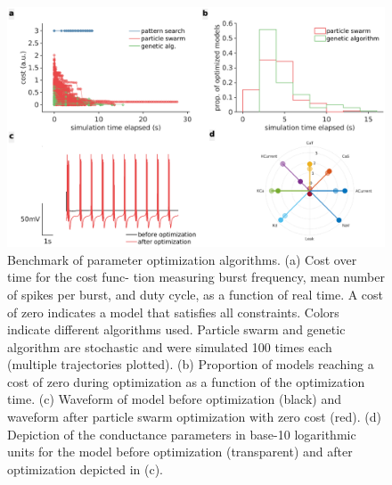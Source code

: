 \documentclass[a4paper,10pt]{article} %
\begin{document}
\begin{figure}[h]
  \includegraphics[width=\textwidth]{gfx/figure_param_opt_benchmark.eps}
  \caption{Benchmark of parameter optimization algorithms. (a) Cost over time for the cost func-
  tion measuring burst frequency, mean number of spikes per burst, and duty cycle, as a function of
  real time. A cost of zero indicates a model that satisfies all constraints. Colors indicate different
  algorithms used. Particle swarm and genetic algorithm are stochastic and were simulated 100 times
  each (multiple trajectories plotted). (b) Proportion of models reaching a cost of zero during optimization
  as a function of the optimization time. (c) Waveform of model before optimization (black)
  and waveform after particle swarm optimization with zero cost (red). (d) Depiction of the conductance parameters
  in base-10 logarithmic units for the model before optimization (transparent) and after optimization depicted in (c).}
\label{fig:optimization}
\end{figure}

\FloatBarrier


\printbibliography
\end{document}
